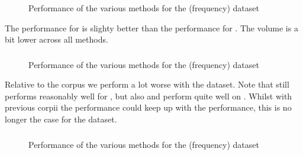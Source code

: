 \subsubsection{\formalin}

\begin{figure}[H]
  \centering
  \caption{Performance of the various methods for the \formalin (frequency) dataset}
\end{figure}

The performance for \formalin is slighty better than the performance for \coq.
The volume is a bit lower across all methods.

\subsubsection{\corn}
\begin{figure}[H]
  \centering
  \caption{Performance of the various methods for the \corn (frequency) dataset}
\end{figure}

Relative to the \coq corpus we perform a lot worse with the \corn dataset.
Note that \adarank still performs reasonably well for \oocover, but also \nb and \ensemble perform quite well on \auc.
Whilst with previous corpii the \knnadaptive performance could keep up with the \knn performance, this is no longer the
case for the \corn dataset.

\subsubsection{\mathclasses}
\begin{figure}[H]
  \centering
  \caption{Performance of the various methods for the \mathclasses (frequency) dataset}
\end{figure}

